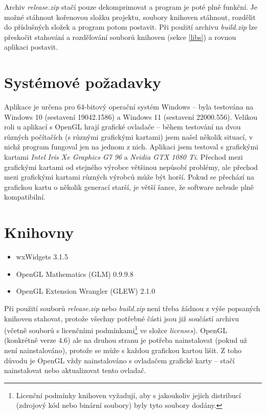 \documentclass[a4paper, 11pt]{report}
\begin{document}
Archiv \emph{release.zip} stačí pouze dekomprimovat a program je poté plně funkční. Je možné stáhnout kořenovou složku projektu, soubory knihoven stáhnout, rozdělit do příslušných složek a program potom postavit. Při použití archivu \emph{build.zip} lze přeskočit stahování a rozdělování souborů knihoven (sekce \ref{libs}) a rovnou aplikaci postavit.

\section{Systémové požadavky}
Aplikace je určena pro 64-bitový operační systém Windows -- byla testována na Windows 10 (sestavení 19042.1586) a Windows 11 (sestavení 22000.556). Velikou roli u aplikací s OpenGL hrají grafické ovladače -- během testování na dvou různých počítačích (s různými grafickými kartami) jsem našel několik situací, v nichž program fungoval jen na jednom z nich. Aplikaci jsem testoval s grafickými kartami \emph{Intel Iris Xe Graphics G7 96} a \emph{Nvidia GTX 1080 Ti}. Přechod mezi grafickými kartami od stejného výrobce většinou nepůsobí problémy, ale přechod mezi grafickými kartami různých výrobců může být horší. Pokud se přechází na grafickou kartu o několik generací starší, je větší šance, že software nebude plně kompatibilní.

\section{Knihovny}
\begin{itemize}
    \item wxWidgets 3.1.5~\cite{lib:wxwidgets}
    \item OpenGL Mathematics (GLM) 0.9.9.8~\cite{lib:glm}
    \item OpenGL Extension Wrangler (GLEW) 2.1.0~\cite{lib:glew}
\end{itemize}
Při použití souborů \emph{release.zip} nebo \emph{build.zip} není třeba žádnou z výše popsaných knihoven stahovat, protože všechny potřebné části jsou již součástí archivu (včetně souborů s licenčními podmínkami\footnote{Licenční podmínky knihoven vyžadují, aby s jakoukoliv jejich distribucí (zdrojový kód nebo binární soubory) byly tyto soubory dodány.} ve složce \emph{licenses}). OpenGL (konkrétně verze 4.6) ale na druhou stranu je potřeba nainstalovat (pokud už není nainstalováno), protože se může s každou grafickou kartou lišit. Z toho důvodu je OpenGL vždy nainstalováno s ovladačem grafické karty -- stačí nainstalovat nebo aktualizovat tento ovladač.
\end{document}
